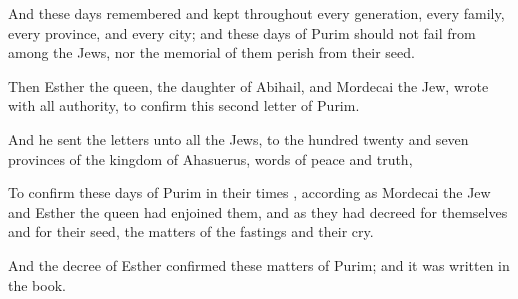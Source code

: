 {And
{} these
days
{}
remembered and
kept
throughout every
generation, every
family, every
province, and every
city; and
{} these
days of
Purim should not
fail from
among the
Jews, nor the
memorial of them
perish from their
seed.

Then
Esther the
queen, the
daughter of
Abihail, and
Mordecai the
Jew,
wrote with all
authority, to
confirm this
second
letter of
Purim.

And he
sent the
letters unto all the
Jews, to the
hundred
twenty and
seven
provinces of the
kingdom of
Ahasuerus,
{}
words of
peace and
truth,

To
confirm these
days of
Purim in their
times
{}, according as
Mordecai the
Jew and
Esther the
queen had
enjoined them, and as they had
decreed for
themselves and for their
seed, the
matters of the
fastings and their
cry.

And the
decree of
Esther
confirmed these
matters of
Purim; and it was
written in the
book.




\par }